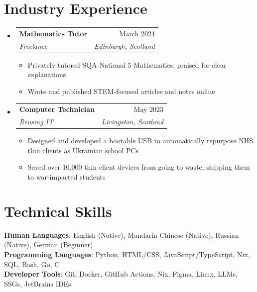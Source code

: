 \documentclass[letterpaper,11pt]{article}
\makeatletter
\newcommand{\resumeItem}[1]{
  \item\small{
    {#1 \vspace{-2pt}}
  }
}
\newcommand{\resumeSubheading}[4]{
  \vspace{-2pt}\item
    \begin{tabular*}{0.97\textwidth}[t]{l@{\extracolsep{\fill}}r}
      \textbf{#1} & #2 \\
      \textit{\small#3} & \textit{\small #4} \\
    \end{tabular*}\vspace{-7pt}
}
\newcommand{\resumeSubHeadingListStart}{\begin{itemize}[leftmargin=0.15in, label={}]}
\newcommand{\resumeSubHeadingListEnd}{\end{itemize}}
\newcommand{\resumeItemListStart}{\begin{itemize}}
\newcommand{\resumeItemListEnd}{\end{itemize}\vspace{-5pt}}
\makeatother
\begin{document}
\section{Industry Experience}
  \resumeSubHeadingListStart
    \resumeSubheading
      {Mathematics Tutor}{March 2024}
      {Freelance}{Edinburgh, Scotland}
      \resumeItemListStart
        \resumeItem{Privately tutored SQA National 5 Mathematics, praised for clear explanations}
        \resumeItem{Wrote and published STEM-focused articles and notes online}
      \resumeItemListEnd
    \resumeSubheading
      {Computer Technician}{May 2023}
      {Reusing IT}{Livingston, Scotland}
      \resumeItemListStart
        \resumeItem{Designed and developed a bootable USB to automatically repurpose NHS thin clients as Ukrainian school PCs}
        \resumeItem{Saved over 10,000 thin client devices from going to waste, shipping them to war-impacted students}
      \resumeItemListEnd
  \resumeSubHeadingListEnd

\section{Technical Skills}
 \begin{itemize}[leftmargin=0.15in, label={}]
    \small{\item{
     \textbf{Human Languages}{: English (Native), Mandarin Chinese (Native), Russian (Native), German (Beginner)} \\
     \textbf{Programming Languages}{: Python, HTML/CSS, JavaScript/TypeScript, Nix, SQL, Bash, Go, C} \\
     \textbf{Developer Tools}{: Git, Docker, GitHub Actions, Nix, Figma, Linux, LLMs, SSGs, JetBrains IDEs}
    }}
 \end{itemize}
\end{document}
